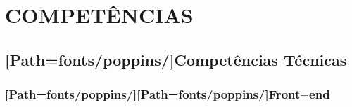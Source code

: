 {\color{primary}\section*{\MakeUppercase{Competências}}}
\vspace{-1em}
\subsection*{[Path=fonts/poppins/]Competências Técnicas}


\vspace{2pt}

{
	\color{black!50}
	\subsubsection*{[Path=fonts/poppins/]\textbf{[Path=fonts/poppins/]Front}$-$end}
}

